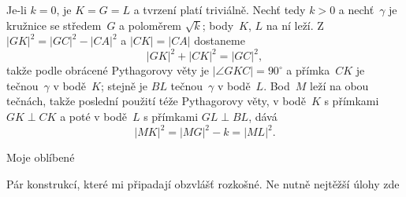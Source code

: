 {    Je-li $k = 0$, je $K = G = L$ a tvrzení platí triviálně. Nechť tedy $k > 0$ a nechť~$\gamma$ je kružnice se středem~$G$ a poloměrem $\sqrt k$; body~$K$, $L$ na ní leží. Z $|GK|^2 = |GC|^2 - |CA|^2$ a $|CK| = |CA|$ dostaneme
    $$
    |GK|^2 + |CK|^2 = |GC|^2,
    $$
    takže podle obrácené Pythagorovy věty je $|\angle GKC| = 90^\circ$ a přímka~$CK$ je tečnou~$\gamma$ v bodě~$K$; stejně je $BL$ tečnou~$\gamma$ v bodě~$L$. Bod~$M$ leží na obou tečnách, takže poslední použití téže Pythagorovy věty, v bodě~$K$ s přímkami $GK \perp CK$ a poté v bodě~$L$ s přímkami $GL \perp BL$, dává
    $$
    |MK|^2 = |MG|^2 - k = |ML|^2.
    $$
}

\secc Moje oblíbené

Pár konstrukcí, které mi připadají obzvlášť rozkošné. Ne nutně nejtěžší úlohy zde \SlightSmile{}

